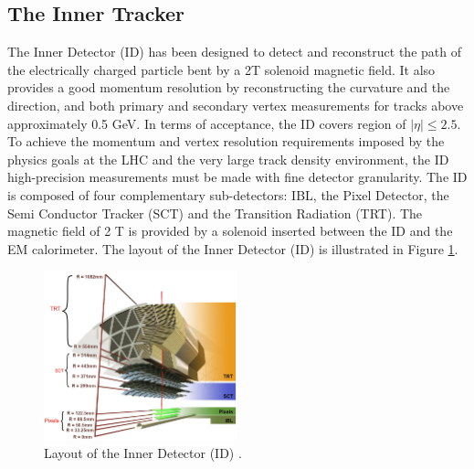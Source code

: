 \subsection{The Inner Tracker}
\label{chap2:ATLAS:ITk}
The Inner Detector (ID) has been designed to detect and reconstruct the path of the electrically charged particle bent by a 2T solenoid magnetic field. It also provides a good momentum resolution by reconstructing the curvature and the direction, and both primary and secondary vertex measurements for tracks above approximately 0.5 GeV\cite{ID_TRD, TrkVertexing}. In terms of acceptance, the ID covers region of $|\eta|\leqslant2.5$. To achieve the momentum and vertex resolution requirements imposed by the physics goals at the LHC and the very large track density environment, the ID high-precision measurements must be made with fine detector granularity. The ID is composed of four complementary sub-detectors: IBL, the Pixel Detector, the Semi Conductor Tracker (SCT) and the Transition Radiation (TRT). The magnetic field of 2 T is provided by a solenoid inserted between the ID and the EM calorimeter. The layout of the Inner Detector (ID) is illustrated in Figure \ref{fig:chap2:ATLAS:ITK:ID}.
\begin{figure}[htbp]
    \centering
    \includegraphics[width=0.5\textwidth]{Ch2/Img/ID_withIBL.png}
    \caption{Layout of the Inner Detector (ID) \cite{ID_withIBL}.}
    \label{fig:chap2:ATLAS:ITK:ID}
\end{figure}
